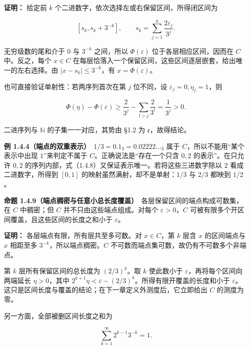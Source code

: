 \documentclass[11pt,a4paper]{article}
\begin{document}
\textbf{证明：} 给定前 \(k\)
个二进数字，依次选择左或右保留区间，所得闭区间为

\begin{equation*}
\left[s_k,s_k+3^{-k}\right],
\qquad s_k=\sum_{j=1}^{k}\frac{2\varepsilon_j}{3^j}.
\tag{1.4.7}
\end{equation*}

无穷级数的尾和介于 \(0\) 与 \(3^{-k}\) 之间，所以 \(\Phi(\varepsilon)\)
位于各层相应区间，因而在 \(C\) 中。反之，每个 \(x\in C\)
在每层恰落入一个保留区间，这些区间逐层嵌套，给出唯一的左右选择。由
\(|x-s_k|\leq3^{-k}\)，有 \(x=\Phi(\varepsilon)\)。

也可直接验证单射性：若两序列首次在第 \(j\) 位不同，设
\(\varepsilon_j=0,\eta_j=1\)，则

\begin{equation*}
\Phi(\eta)-\Phi(\varepsilon)
\geq\frac{2}{3^j}-\sum_{l>j}\frac{2}{3^l}
=\frac1{3^j}>0.
\tag{1.4.8}
\end{equation*}

二进序列与 \(\mathbb N\) 的子集一一对应，其势由 §1.2 为
\(\mathfrak c\)，故得结论。

\textbf{例 1.4.4（端点的双重表示）}　\(1/3=0.1_3=0.02222\ldots_3\) 属于
\(C\)，所以不能用``某个表示中出现 \(1\)''来判定不属于
\(C\)。正确说法是``存在一个只含 \(0,2\) 的表示''。在只允许 \(0,2\)
的序列内部，式（1.4.8）又保证表示唯一。若将这些三进数字除以 \(2\)
看成二进数字，所得到 \([0,1]\) 的映射虽然满射，却不是单射：\(1/3\) 与
\(2/3\) 都映到 \(1/2\)。

\textbf{命题
1.4.9（端点稠密与任意小总长度覆盖）}　各层保留区间的端点构成可数集，在
\(C\) 中稠密；但 \(C\) 并不只由这些端点组成。对每个
\(\varepsilon>0\)，\(C\)
可被有限多个开区间覆盖，且这些区间的长度之和小于 \(\varepsilon\)。

\textbf{证明：} 各层端点有限，所有层共至多可数。对 \(x\in C\)，第 \(k\)
层含 \(x\) 的区间端点与 \(x\) 相距至多 \(3^{-k}\)，所以端点稠密。\(C\)
不可数而端点集可数，故仍有不可数多个非端点。

第 \(k\) 层所有保留区间的总长度为 \((2/3)^k\)。取 \(k\) 使此数小于
\(\varepsilon\)，再将每个区间向两端延长 \(\eta>0\)，其中
\(2^{k+1}\eta<\varepsilon-(2/3)^k\)。所得有限开覆盖的长度和小于
\(\varepsilon\)。这只是区间长度与覆盖的结论；在下一章定义外测度后，它立即给出
\(C\) 的测度为零。

另一方面，全部被删区间长度之和为

\begin{equation*}
\sum_{k=1}^{\infty}2^{k-1}3^{-k}=1.
\tag{1.4.9}
\end{equation*}
\end{document}
